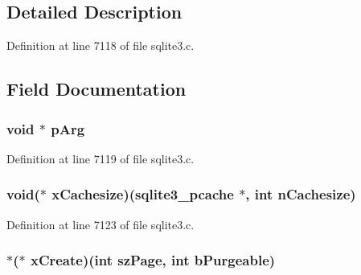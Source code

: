 \subsection{Detailed Description}


Definition at line 7118 of file sqlite3.\+c.



\subsection{Field Documentation}
\hypertarget{structsqlite3__pcache__methods_a3717fa60d029e21cf1253154e5bdd969}{}
\subsubsection[{p\+Arg}]{\setlength{\rightskip}{0pt plus 5cm}void $\ast$ p\+Arg}\label{structsqlite3__pcache__methods_a3717fa60d029e21cf1253154e5bdd969}


Definition at line 7119 of file sqlite3.\+c.

\hypertarget{structsqlite3__pcache__methods_a1a71e7cecb9abff1fcc9594e0120091b}{}
\subsubsection[{x\+Cachesize}]{\setlength{\rightskip}{0pt plus 5cm}void($\ast$ x\+Cachesize)({\bf sqlite3\+\_\+pcache} $\ast$, int n\+Cachesize)}\label{structsqlite3__pcache__methods_a1a71e7cecb9abff1fcc9594e0120091b}


Definition at line 7123 of file sqlite3.\+c.

\hypertarget{structsqlite3__pcache__methods_a8eeedccf480e19867d82b11b5b59cc69}{}
\subsubsection[{x\+Create}]{ $\ast$($\ast$ x\+Create)(int sz\+Page, int b\+Purgeable)}\label{structsqlite3__pcache__methods_a8eeedccf480e19867d82b11b5b59cc69}


